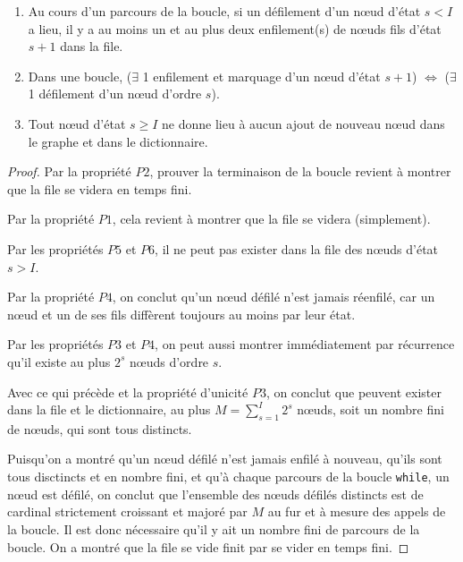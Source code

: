\documentclass[svgnames,dvipsnames,a4paper,10pt,french]{report}
\begin{document}
\begin{appendices}
\begin{enumerate}[label=(\subscript{P}{{\arabic*}})]
    \item Au cours d'un parcours de la boucle, si un défilement d'un n\oe{}ud d'état $s<I$ a lieu, il y a au moins un et au plus deux enfilement(s) de  n\oe{}uds fils d'état $s+1$ dans la file. 
    \item Dans une boucle, ($\exists$ 1 enfilement et marquage d'un n\oe{}ud d'état $s+1$) $\Longleftrightarrow$ ($\exists$ 1 défilement d'un n\oe{}ud d'ordre $s$).
    \item Tout n\oe{}ud d'état $s\ge I$ ne donne lieu à aucun ajout de nouveau n\oe{}ud dans le graphe et dans le dictionnaire.
\end{enumerate}

\begin{proof}
Par la propriété $P2$, prouver la terminaison de la boucle revient à montrer que la file se videra en temps fini.

Par la propriété $P1$, cela revient à montrer que la file se videra (simplement).

Par les propriétés $P5$ et $P6$, il ne peut pas exister dans la file  des n\oe{}uds d'état $s > I$.

Par la propriété $P4$, on conclut qu'un n\oe{}ud défilé n'est jamais réenfilé, car un n\oe{}ud et un de ses fils diffèrent toujours au moins par leur état.

Par les propriétés $P3$ et $P4$, on peut aussi montrer immédiatement par récurrence qu'il existe au plus $2^s$ n\oe{}uds d'ordre $s$.

Avec ce qui précède et la propriété d'unicité $P3$, on conclut que peuvent exister dans la file et le dictionnaire, au plus $M=\sum_{s=1}^I 2^s$ n\oe{}uds, soit un nombre fini de n\oe{}uds, qui sont tous distincts.

Puisqu'on a montré qu'un n\oe{}ud défilé n'est jamais enfilé à nouveau, qu'ils sont tous disctincts et en nombre fini, et qu'à chaque parcours de la boucle \texttt{while}, un n\oe{}ud est défilé, on conclut que l'ensemble des n\oe{}uds défilés distincts est de cardinal strictement croissant et majoré par $M$ au fur et à mesure des appels de la boucle. Il est donc nécessaire qu'il y ait un nombre fini de parcours de la boucle. On a montré que la file se vide finit par se vider  en temps fini.
\end{proof}





\end{appendices}
\end{document}
